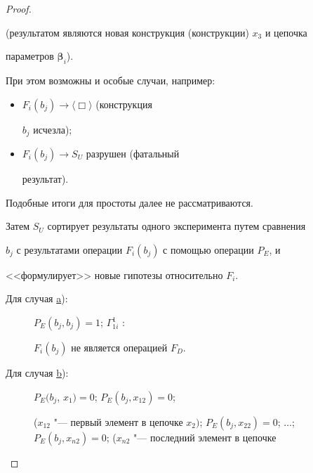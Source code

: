 \begin{proof}
\begin{itemize}
(результатом являются новая конструкция (конструкции) $x_{3}$ и цепочка

параметров $\boldsymbol{\beta}_{i}$).



\end{itemize}



При этом возможны и особые случаи, например:

\begin{itemize}

\item[e)] \hypertarget{kr:e}{} $F_{i}(b_{j})\to \langle \Box \rangle$ (конструкция

$b_{j}$ исчезла);



\item[f)] \hypertarget{kr:f}{} $F_{i}(b_{j})\to  S_{U}$ разрушен (фатальный

результат).



\end{itemize}



Подобные итоги для простоты далее не рассматриваются.



Затем $S_{U}$ сортирует результаты одного эксперимента путем сравнения

$b_{j}$ с результатами операции $F_{i}(b_{j})$ с помощью операции $P_{E}$, и

<<формулирует>> новые гипотезы относительно $F_{i}$.



\begin{description}





\item[Для случая \hyperlink{kr:a}{a}):] $P_{E}(b_{j},b_{j}) = 1$; $\Gamma^{1}_{1i}$ :

$F_{i}(b_{j})$ не является операцией $F_{D}$.



\item[Для случая \hyperlink{kr:b}{b}):] $P_{E}(b_{j}$, $x_{1}) = 0$; $P_{E}(b_{j}, x_{12}) = 0$;

($x_{12}$ "--- первый элемент в цепочке $x_{2})$; $P_{E}(b_{j}, x_{22}) =

0$; $\ldots$; $P_{E}(b_{j}, x_{n2}) = 0$; ($x_{n2}$ "--- последний элемент в цепочке


\end{description}
\end{proof}
